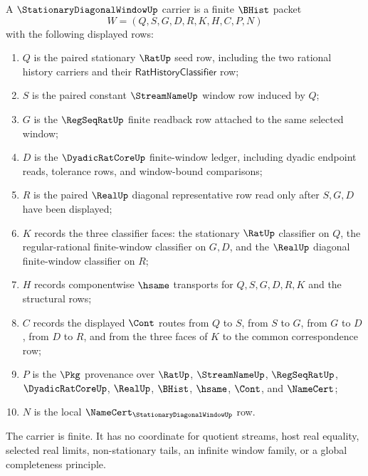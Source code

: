 \begin{definition}
\label{def:stationary-diagonal-window-carrier}
A $\StationaryDiagonalWindowUp$ carrier is a finite $\BHist$ packet
$$
W=(Q,S,G,D,R,K,H,C,P,N)
$$
with the following displayed rows:
\begin{enumerate}
\item $Q$ is the paired stationary $\RatUp$ seed row, including the two rational history carriers and their $\mathsf{RatHistoryClassifier}$ row;
\item $S$ is the paired constant $\StreamNameUp$ window row induced by $Q$;
\item $G$ is the $\RegSeqRatUp$ finite readback row attached to the same selected window;
\item $D$ is the $\DyadicRatCoreUp$ finite-window ledger, including dyadic endpoint reads, tolerance rows, and window-bound comparisons;
\item $R$ is the paired $\RealUp$ diagonal representative row read only after $S,G,D$ have been displayed;
\item $K$ records the three classifier faces: the stationary $\RatUp$ classifier on $Q$, the regular-rational finite-window classifier on $G,D$, and the $\RealUp$ diagonal finite-window classifier on $R$;
\item $H$ records componentwise $\hsame$ transports for $Q,S,G,D,R,K$ and the structural rows;
\item $C$ records the displayed $\Cont$ routes from $Q$ to $S$, from $S$ to $G$, from $G$ to $D$, from $D$ to $R$, and from the three faces of $K$ to the common correspondence row;
\item $P$ is the $\Pkg$ provenance over $\RatUp$, $\StreamNameUp$, $\RegSeqRatUp$, $\DyadicRatCoreUp$, $\RealUp$, $\BHist$, $\hsame$, $\Cont$, and $\NameCert$;
\item $N$ is the local $\NameCert_{\StationaryDiagonalWindowUp}$ row.
\end{enumerate}
The carrier is finite. It has no coordinate for quotient streams, host real equality, selected real limits, non-stationary tails, an infinite window family, or a global completeness principle.
\end{definition}

